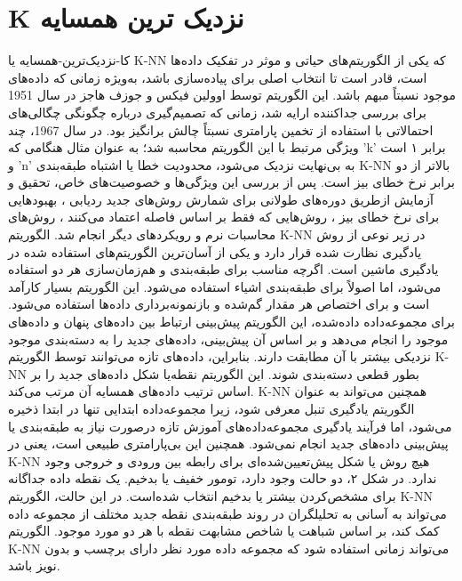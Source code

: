\documentclass{CSICC2020}
\begin{document}
\section{K نزدیک ترین همسایه  }
کا-نزدیک‌ترین-همسایه یا K-NN که یکی از الگوریتم‌های حیاتی و موثر در تفکیک داده‌ها است، قادر است تا انتخاب اصلی برای پیاده‌سازی باشد، به‌ویژه زمانی که داده‌های موجود نسبتاً مبهم باشد. این الگوریتم توسط اوولین فیکس و جوزف هاجز در سال 1951 برای بررسی جداکننده ارایه شد، زمانی که تصمیم‌گیری درباره چگونگی چگالی‌های احتمالاتی با استفاده از تخمین پارامتری نسبتاً چالش برانگیز بود. در سال 1967، چند ویژگی مرتبط با این الگوریتم محاسبه شد؛ به عنوان مثال هنگامی که 'k' برابر ۱ است و 'n' به بی‌نهایت نزدیک می‌شود، محدودیت خطا یا اشتباه طبقه‌بندی K-NN بالاتر از دو برابر نرخ خطای بیز است. پس از بررسی این ویژگی‌ها و خصوصیت‌های خاص، تحقیق و آزمایش ازطریق دوره‌های طولانی برای شمارش روش‌های جدید ردیابی ، بهبودهایی برای نرخ خطای بیز ، روش‌هایی که فقط بر اساس فاصله اعتماد می‌کنند ، روش‌های محاسبات نرم  و رویکردهای دیگر انجام شد. الگوریتم K-NN در زیر نوعی از روش یادگیری نظارت شده قرار دارد و یکی از آسان‌ترین الگوریتم‌های استفاده شده در یادگیری ماشین است. اگرچه مناسب برای طبقه‌بندی و هم‌زمان‌سازی هر دو استفاده می‌شود، اما اصولاً برای طبقه‌بندی اشیاء استفاده می‌شود. این الگوریتم بسیار کارآمد است و برای اختصاص هر مقدار گم‌شده و باز‌نمونه‌برداری داده‌ها استفاده می‌شود. برای مجموعه‌داده داده‌شده، این الگوریتم پیش‌بینی ارتباط بین داده‌های پنهان و داده‌های موجود را انجام می‌دهد و بر اساس آن پیش‌بینی، داده‌های جدید را به دسته‌بندی موجود نزدیکی بیشتر با آن مطابقت دارند. بنابراین، داده‌های تازه می‌توانند توسط الگوریتم K-NN بطور قطعی دسته‌بندی شوند. این الگوریتم نقطه‌یا شکل داده‌های جدید را بر اساس ترتیب داده‌های همسایه ‌آن مرتب می‌کند. K-NN همچنین می‌تواند به عنوان الگوریتم یادگیری تنبل معرفی شود، زیرا مجموعه‌داده ابتدایی تنها در ابتدا ذخیره می‌شود، اما فرآیند یادگیری مجموعه‌داده‌های آموزش تازه درصورت نیاز به طبقه‌بندی یا پیش‌بینی داده‌های جدید انجام نمی‌شود.  همچنین این بی‌پارامتری طبیعی است، یعنی در K-NN هیچ روش یا شکل پیش‌تعیین‌شده‌ای برای رابطه بین ورودی و خروجی وجود ندارد. در شکل ۲، دو حالت وجود دارد، تومور خفیف یا بدخیم. یک نقطه داده جداگانه برای مشخص‌کردن بیشتر یا بدخیم انتخاب شده‌است. در این حالت، الگوریتم K-NN می‌تواند به آسانی به تحلیلگران در روند طبقه‌بندی نقطه جدید مختلف از مجموعه داده کمک کند، بر اساس شباهت یا شاخص مشابهت نقطه با هر دو مورد موجود. الگوریتم K-NN می‌تواند زمانی استفاده شود که مجموعه داده مورد نظر دارای برچسب و بدون نویز باشد.
\end{document}
